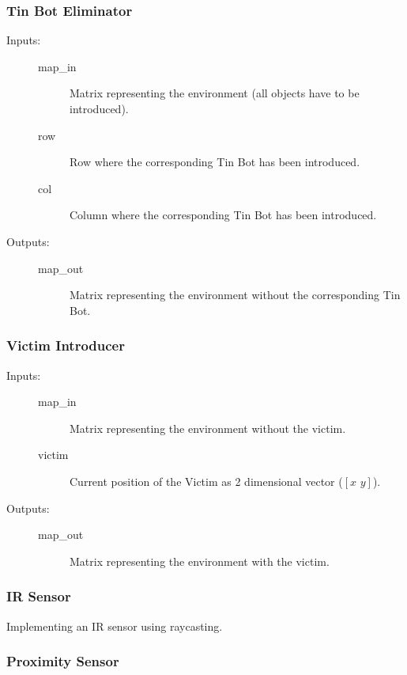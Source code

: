\documentclass[a4paper,parskip,headheight=38pt]{scrartcl} %
\begin{document}
\subsubsection{Tin Bot Eliminator}
\begin{description}
\item[Inputs:] \hfill
	\begin{description}
	\item[map\_in] Matrix representing the environment (all objects have to be introduced).
	\item[row] Row where the corresponding Tin Bot has been introduced.
	\item[col] Column where the corresponding Tin Bot has been introduced.
	\end{description}
\item[Outputs:] \hfill
	\begin{description}
	\item[map\_out] Matrix representing the environment without the corresponding Tin Bot.
	\end{description}
\end{description}

\subsubsection{Victim Introducer}
\begin{description}
\item[Inputs:] \hfill
	\begin{description}
	\item[map\_in] Matrix representing the environment without the victim.
	\item[victim] Current position of the Victim as 2 dimensional vector ($[x\,\, y]$). 
	\end{description}
\item[Outputs:] \hfill
	\begin{description}
	\item[map\_out] Matrix representing the environment with the victim.
	\end{description}
\end{description}

\subsubsection{IR Sensor}
Implementing an IR sensor using raycasting.


\subsubsection{Proximity Sensor}
\end{document}
